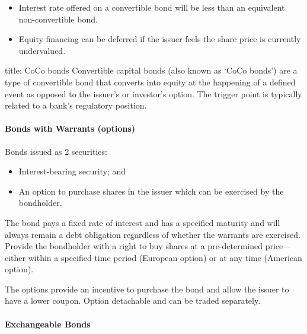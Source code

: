 \documentclass[
]{article}
\newenvironment{Shaded}{}{}
\newcommand{\NormalTok}[1]{#1}
\providecommand{\tightlist}{%
  \setlength{\itemsep}{0pt}\setlength{\parskip}{0pt}}
\begin{document}
\begin{itemize}
\tightlist
\item
  Interest rate offered on a convertible bond will be less than an
  equivalent non-convertible bond.
\item
  Equity financing can be deferred if the issuer feels the share price
  is currently undervalued.
\end{itemize}

\begin{Shaded}
\begin{Highlighting}[]
\NormalTok{title: CoCo bonds}
\NormalTok{Convertible capital bonds (also known as ‘CoCo bonds’) are a type of convertible bond that converts into equity at the happening of a defined event as opposed to the issuer’s or investor’s option. The trigger point is typically related to a bank’s regulatory position.}
\end{Highlighting}
\end{Shaded}

\hypertarget{bonds-with-warrants-options}{%
\paragraph{Bonds with Warrants
(options)}\label{bonds-with-warrants-options}}

Bonds issued as 2 securities:

\begin{itemize}
\tightlist
\item
  Interest-bearing security; and
\item
  An option to purchase shares in the issuer which can be exercised by
  the bondholder.
\end{itemize}

The bond pays a fixed rate of interest and has a specified maturity and
will always remain a debt obligation regardless of whether the warrants
are exercised. Provide the bondholder with a right to buy shares at a
pre-determined price -- either within a specified time period (European
option) or at any time (American option).

The options provide an incentive to purchase the bond and allow the
issuer to have a lower coupon. Option detachable and can be traded
separately.

\hypertarget{exchangeable-bonds}{%
\paragraph{Exchangeable Bonds}\label{exchangeable-bonds}}
\end{document}

